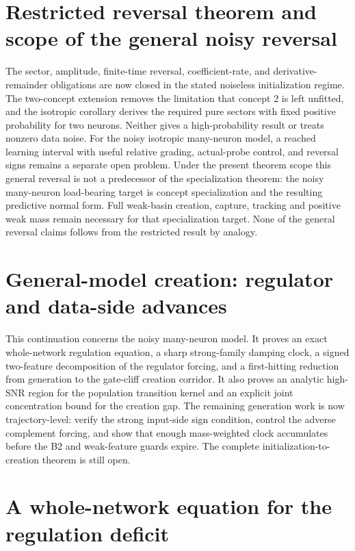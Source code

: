 \documentclass{article} %
\theoremstyle{plain}
\theoremstyle{definition}
\theoremstyle{remark}
\begin{document}
\section{Restricted reversal theorem and scope of the general noisy reversal}
The sector, amplitude, finite-time reversal, coefficient-rate, and
derivative-remainder obligations are now closed in the stated noiseless
initialization regime. The two-concept extension removes the limitation
that concept 2 is left unfitted, and the isotropic corollary derives the
required pure sectors with fixed positive probability for two neurons.
Neither gives a high-probability result or treats nonzero data noise.
For the noisy isotropic many-neuron model, a reached learning interval with
useful relative grading, actual-probe control, and reversal signs remains a
separate open problem.  Under the present theorem scope this general reversal
is not a predecessor of the specialization theorem: the noisy many-neuron
load-bearing target is concept specialization and the resulting predictive
normal form.  Full weak-basin creation, capture, tracking and positive weak
mass remain necessary for that specialization target.  None of the general
reversal claims follows from the restricted result by analogy.

\section{General-model creation: regulator and data-side advances}
\label{sbgen:scope}

This continuation concerns the noisy many-neuron model.  It proves an exact
whole-network regulation equation, a sharp strong-family damping clock, a
signed two-feature decomposition of the regulator forcing, and a
first-hitting reduction from generation to the gate-cliff creation corridor.
It also proves an analytic high-SNR region for the population transition
kernel and an explicit joint concentration bound for the creation gap.  The
remaining generation work is now trajectory-level: verify the strong
input-side sign condition, control the adverse complement forcing, and show
that enough mass-weighted clock accumulates before the B2 and weak-feature
guards expire.  The complete initialization-to-creation theorem is still
open.

\section{A whole-network equation for the regulation deficit}
\label{sbgen:regulation-section}
\end{document}
